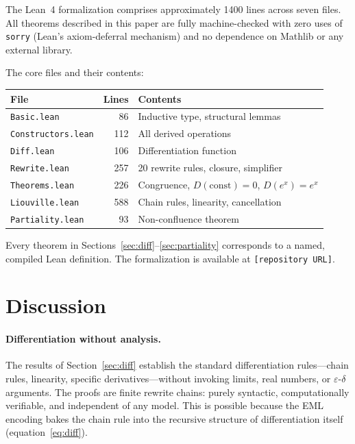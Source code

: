 \documentclass[11pt]{article}
\begin{document}
The Lean~4 formalization comprises approximately 1400 lines across
seven files.  All theorems described in this paper are fully
machine-checked with zero uses of \texttt{sorry} (Lean's axiom-deferral
mechanism) and no dependence on Mathlib or any external library.

The core files and their contents:

\medskip
\begin{tabular}{lrl}
\textbf{File} & \textbf{Lines} & \textbf{Contents} \\
\hline
\texttt{Basic.lean}        &  86 & Inductive type, structural lemmas \\
\texttt{Constructors.lean} & 112 & All derived operations \\
\texttt{Diff.lean}         & 106 & Differentiation function \\
\texttt{Rewrite.lean}      & 257 & 20 rewrite rules, closure, simplifier \\
\texttt{Theorems.lean}     & 226 & Congruence, $D(\text{const})=0$, $D(e^x)=e^x$ \\
\texttt{Liouville.lean}    & 588 & Chain rules, linearity, cancellation \\
\texttt{Partiality.lean}   &  93 & Non-confluence theorem \\
\end{tabular}

\medskip\noindent
Every theorem in Sections~\ref{sec:diff}--\ref{sec:partiality}
corresponds to a named, compiled Lean definition.  The formalization
is available at \texttt{[repository URL]}.

\section{Discussion}
\label{sec:discussion}

\paragraph{Differentiation without analysis.}
The results of Section~\ref{sec:diff} establish the standard
differentiation rules---chain rules, linearity, specific
derivatives---without invoking limits, real numbers, or
$\varepsilon$-$\delta$ arguments.  The proofs are finite rewrite
chains: purely syntactic, computationally verifiable, and independent
of any model.  This is possible because the EML encoding bakes the
chain rule into the recursive structure of differentiation itself
(equation~\eqref{eq:diff}).
\end{document}
